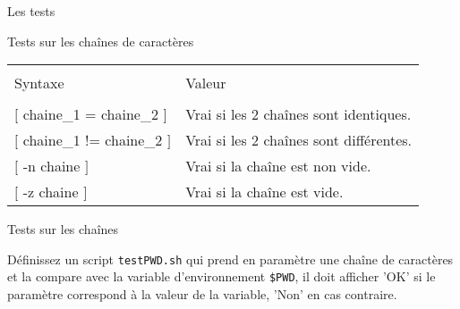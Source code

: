 \begin{frame}{Les tests}
	\begin{block}{Tests sur les chaînes de caractères}
		\begin{center}
			\begin{tabular}{ll}
				\hline\\
				Syntaxe&Valeur\\
				\hline\\
				$[$ chaine\_1 = chaine\_2 $]$&Vrai si les 2 chaînes sont identiques.\\[2pt]
				$[$ chaine\_1 != chaine\_2 $]$&Vrai si les 2 chaînes sont différentes.\\[2pt]
				$[$ -n chaine $]$&Vrai si la chaîne est non vide.\\[2pt]
				$[$ -z chaine $]$&Vrai si la chaîne est vide.\\[2pt]
				\hline
			\end{tabular}
		\end{center}
	\end{block}
	
	  \begin{exercicelet}{Tests sur les chaînes}
    \begin{questions}
    \item Définissez un script \texttt{testPWD.sh} qui prend en paramètre une chaîne de caractères et la compare avec la variable d'environnement \texttt{\$PWD}, il doit afficher 'OK' si le paramètre correspond à la valeur de la variable, 'Non' en cas contraire.
    \end{questions}
  \end{exercicelet}
  
\end{frame}

